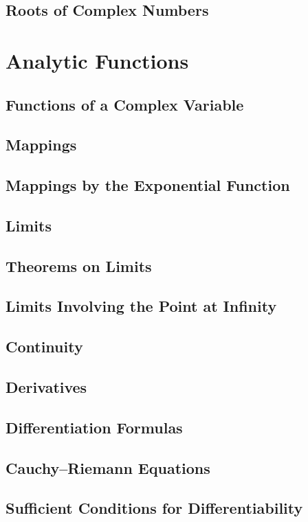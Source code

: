 \documentclass{book}
\theoremstyle{definition}
\begin{document}
\section{Roots of Complex Numbers}





\newpage



\chapter{Analytic Functions}

\section{Functions of a Complex Variable}
\section{Mappings}
\section{Mappings by the Exponential Function}
\section{Limits}
\section{Theorems on Limits}
\section{Limits Involving the Point at Infinity}
\section{Continuity}
\section{Derivatives}
\section{Differentiation Formulas}
\section{Cauchy–Riemann Equations}
\section{Sufficient Conditions for Differentiability}
\end{document}
